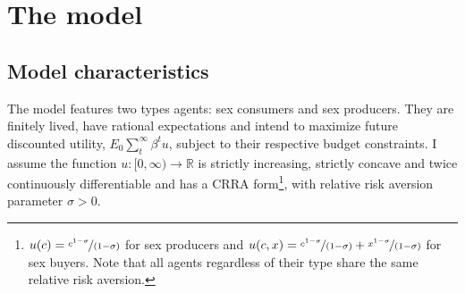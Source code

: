 \section{The model}\label{sec4}
\subsection{Model characteristics}
The model features two types agents: sex consumers and sex producers. They are finitely lived, have rational expectations and intend to maximize future discounted utility, $E_{0}\sum_{t}^{\infty}\beta^{t}u$, subject to their respective budget constraints. I assume the function $u:[0,\infty)\to \mathbb{R}$ is strictly increasing, strictly concave and twice continuously differentiable and has a CRRA form\footnote{$u(c)=\nicefrac{c^{1-\sigma}}{(1-\sigma)}$ for sex producers and $u(c,x)=\nicefrac{c^{1-\sigma}}{(1-\sigma)}+\nicefrac{x^{1-\sigma}}{(1-\sigma)}$ for sex buyers.  Note that all agents regardless of their type share the same relative risk aversion. }, with relative risk aversion parameter $\sigma>0$.


